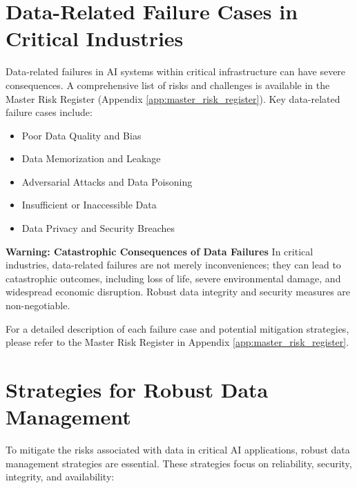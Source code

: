 \section{Data-Related Failure Cases in Critical Industries}
\label{sec:data_failure_cases}

Data-related failures in AI systems within critical infrastructure can have severe consequences. A comprehensive list of risks and challenges is available in the Master Risk Register (Appendix \ref{app:master_risk_register}). Key data-related failure cases include:

\begin{itemize}
    \item Poor Data Quality and Bias
    \item Data Memorization and Leakage
    \item Adversarial Attacks and Data Poisoning
    \item Insufficient or Inaccessible Data
    \item Data Privacy and Security Breaches
\end{itemize}

\begin{warningbox}
    \textbf{Warning: Catastrophic Consequences of Data Failures}
    In critical industries, data-related failures are not merely inconveniences; they can lead to catastrophic outcomes, including loss of life, severe environmental damage, and widespread economic disruption. Robust data integrity and security measures are non-negotiable.
\end{warningbox}

For a detailed description of each failure case and potential mitigation strategies, please refer to the Master Risk Register in Appendix \ref{app:master_risk_register}.

\section{Strategies for Robust Data Management}
\label{sec:data_management_strategies}
To mitigate the risks associated with data in critical AI applications, robust data management strategies are essential. These strategies focus on reliability, security, integrity, and availability:

